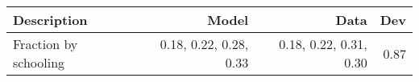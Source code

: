 \begin{tabular}{lrrr}
\hline
Description & Model  & Data  & Dev  \\ 
\hline
Fraction by schooling & 0.18, 0.22, 0.28, 0.33  & 0.18, 0.22, 0.31, 0.30  & 0.87  \\ 
\hline
\end{tabular}%
